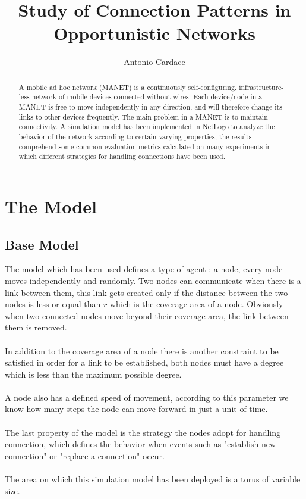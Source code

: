 \documentclass{llncs}
\begin{document}
\mainmatter              %
%
\title{Study of Connection Patterns in Opportunistic Networks}
%
\author{Antonio Cardace}
%
\maketitle
%
\begin{abstract}
A mobile ad hoc network (MANET) is a continuously self-configuring, infrastructure-less network of mobile devices connected without wires. Each   device/node in a MANET is free to move independently in any direction, and   will therefore change its links to other devices frequently. The main problem in a MANET is to maintain connectivity. A simulation model has been implemented in NetLogo to analyze the behavior of the network according to certain varying properties, the results comprehend some common evaluation metrics calculated on many experiments in which different strategies for handling connections have been used.
\end{abstract}

\section{The Model}
\subsection{Base Model}
The model which has been used defines a type of agent : a node, every node moves independently and randomly. Two nodes can communicate when there is a link between them, this link gets created only if the distance between the two nodes is less or equal than $r$ which is the coverage area of a node. Obviously when two connected nodes move beyond their coverage area, the link between them is removed.\\\\
%
In addition to the coverage area of a node there is another constraint to be satisfied in order for a link to be established, both nodes must have a degree which is less than the maximum possible degree.\\\\
%
A node also has a defined speed of movement, according to this parameter we know how many steps the node can move forward in just a unit of time.\\\\
%
The last property of the model is the strategy the nodes adopt for handling connection, which defines the behavior when events such as "establish new connection" or "replace a connection" occur.\\\\
%
The area on which this simulation model has been deployed is a torus of variable size.\\
%
\end{document}
